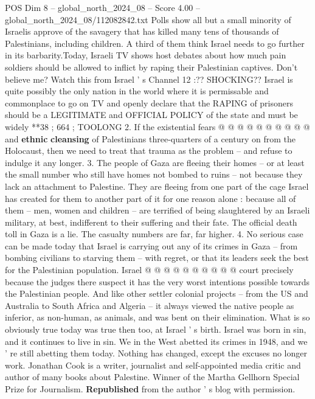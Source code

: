 \begin{textsample}{POS Dim 8 – global\_north\_2024\_08 – Score 4.00 – global\_north\_2024\_08/112082842.txt}
Polls show all but a small minority of Israelis approve of the savagery that has killed many tens of thousands of Palestinians, including children.
A third of them think Israel needs to go further in its barbarity.Today, Israeli TV shows host debates about how much pain soldiers should be allowed to inflict by raping their Palestinian captives.
Don't believe me?
Watch this from Israel ' s Channel 12 :??
SHOCKING??
Israel is quite possibly the only nation in the world where it is permissable and commonplace to go on TV and openly declare that the RAPING of prisoners should be a LEGITIMATE and OFFICIAL POLICY of the state and must be widely **38 ; 664 ; TOOLONG 2.
If the existential fears @ @ @ @ @ @ @ @ @ @ and \textbf{ethnic} \textbf{cleansing} of Palestinians three-quarters of a century on from the Holocaust, then we need to treat that trauma as the problem -- and refuse to indulge it any longer. 3.
The people of Gaza are fleeing their homes -- or at least the small number who still have homes not bombed to ruins -- not because they lack an attachment to Palestine.
They are fleeing from one part of the cage Israel has created for them to another part of it for one reason alone : because all of them -- men, women and children -- are terrified of being slaughtered by an Israeli military, at best, indifferent to their suffering and their fate.
The official death toll in Gaza is a lie.
The casualty numbers are far, far higher. 4.
No serious case can be made today that Israel is carrying out any of its crimes in Gaza -- from bombing civilians to starving them -- with regret, or that its leaders seek the best for the Palestinian population.
Israel @ @ @ @ @ @ @ @ @ @ court precisely because the judges there suspect it has the very worst intentions possible towards the Palestinian people.
And like other settler colonial projects -- from the US and Australia to South Africa and Algeria -- it always viewed the native people as inferior, as non-human, as animals, and was bent on their elimination.
What is so obviously true today was true then too, at Israel ' s birth.
Israel was born in sin, and it continues to live in sin.
We in the West abetted its crimes in 1948, and we ' re still abetting them today.
Nothing has changed, except the excuses no longer work.
Jonathan Cook is a writer, journalist and self-appointed media critic and author of many books about Palestine.
Winner of the Martha Gellhorn Special Prize for Journalism. \textbf{Republished} from the author ' s blog with permission.

\end{textsample}
